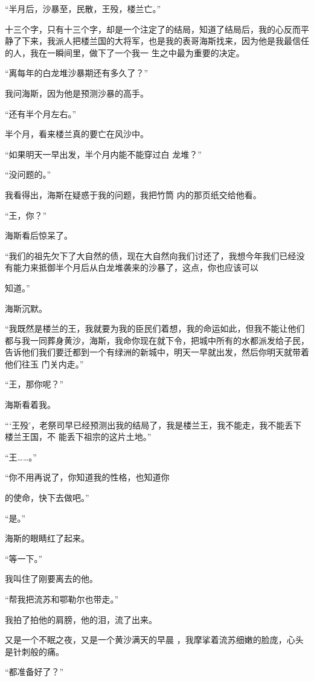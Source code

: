 \documentclass{article}
\begin{document}
“半月后，沙暴至，民散，王殁，楼兰亡。”
 

十三个字，只有十三个字，却是一个注定了的结局，知道了结局后，我的心反而平静了下来，我派人把楼兰国的大将军，也是我的表哥海斯找来，因为他是我最信任的人，我在一瞬间里，做下了一个我一
生之中最为重要的决定。 


“离每年的白龙堆沙暴期还有多久了？” 


\newpage

我问海斯，因为他是预测沙暴的高手。 


“还有半个月左右。” 


半个月，看来楼兰真的要亡在风沙中。 

“如果明天一早出发，半个月内能不能穿过白
龙堆？” 


“没问题的。” 

我看得出，海斯在疑惑于我的问题，我把竹筒
内的那页纸交给他看。 


“王，你？” 


海斯看后惊呆了。 

“我们的祖先欠下了大自然的债，现在大自然向我们讨还了，我想今年我们已经没有能力来抵御半个月后从白龙堆袭来的沙暴了，这点，你也应该可以

\newpage
知道。” 


海斯沉默。 

“我既然是楼兰的王，我就要为我的臣民们着想，我的命运如此，但我不能让他们都与我一同葬身黄沙，海斯，我命你现在就下令，把城中所有的水都派发给子民，告诉他们我们要迁都到一个有绿洲的新城中，明天一早就出发，然后你明天就带着他们往玉
门关内走。” 


“王，那你呢？” 


海斯看着我。 

“‘王殁’，老祭司早已经预测出我的结局了，我是楼兰王，我不能走，我不能丢下楼兰王国，不
能丢下祖宗的这片土地。” 


“王……。” 

“你不用再说了，你知道我的性格，也知道你
\newpage

的使命，快下去做吧。” 


“是。” 


海斯的眼睛红了起来。 


“等一下。” 


我叫住了刚要离去的他。 


“帮我把流苏和鄂勒尔也带走。” 


我拍了拍他的肩膀，他的泪，流了出来。 

又是一个不眠之夜，又是一个黄沙满天的早晨
，我摩挲着流苏细嫩的脸庞，心头是针刺般的痛。 


“都准备好了？” 
\end{document}
